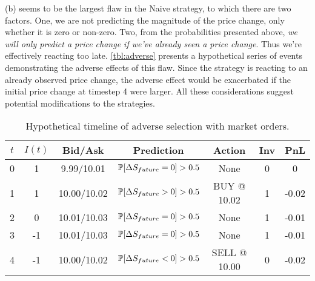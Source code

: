 (b) seems to be the largest flaw in the Naive strategy, to which there are two factors. One, we are not predicting the magnitude of the price change, only whether it is zero or non-zero. Two, from the probabilities presented above, \emph{we will only predict a price change if we've already seen a price change}. Thus we're effectively reacting too late. \autoref{tbl:adverse} presents a hypothetical series of events demonstrating the adverse effects of this flaw. Since the strategy is reacting to an already observed price change, the adverse effect would be exacerbated if the initial price change at timestep 4 were larger. All these considerations suggest potential modifications to the strategies.

\begin{table}
\centering
{}
\begin{tabular}{@{} *{7}{c} @{}}
\toprule
$t$ & $I(t)$ & Bid/Ask & Prediction & Action & Inv & PnL \\
\midrule
0 & 1 & \hphantom{1}9.99/10.01 & $\P[\Delta S_{future} = 0] > 0.5$ & None & 0 & 0 \\
1 & 1 & 10.00/10.02 & $\P[\Delta S_{future} > 0] > 0.5$ & BUY @ 10.02 & 1 & -0.02 \\
2 & 0 & 10.01/10.03 & $\P[\Delta S_{future} = 0] > 0.5$ & None & 1 & -0.01 \\
3 & -1 & 10.01/10.03 & $\P[\Delta S_{future} = 0] > 0.5$ & None & 1 & -0.01 \\
4 & -1 & 10.00/10.02 & $\P[\Delta S_{future} < 0] > 0.5$ & SELL @ 10.00 & 0 & -0.02 \\
\bottomrule
\end{tabular}
\caption{Hypothetical timeline of adverse selection with market orders.}
\label{tbl:adverse}
\end{table}